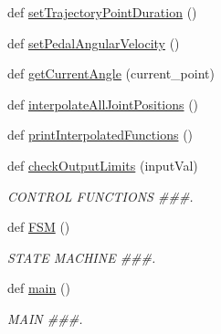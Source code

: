 \begin{DoxyCompactItemize}
\item 
def \mbox{\hyperlink{namespacepedal__simulation__old__trajectory_a21cef15e773ef15a13e249e9313e0f74}{set\+Trajectory\+Point\+Duration}} ()
\item 
def \mbox{\hyperlink{namespacepedal__simulation__old__trajectory_a19dadcf9c99ead53140bc2edb68da664}{set\+Pedal\+Angular\+Velocity}} ()
\item 
def \mbox{\hyperlink{namespacepedal__simulation__old__trajectory_adb00e116383a808c8e63e92e0dcbc8ca}{get\+Current\+Angle}} (current\+\_\+point)
\item 
def \mbox{\hyperlink{namespacepedal__simulation__old__trajectory_aec342beef8b921d695775893efd3692b}{interpolate\+All\+Joint\+Positions}} ()
\item 
def \mbox{\hyperlink{namespacepedal__simulation__old__trajectory_a0d6e7922b0f53ee00a3789bd06837dcf}{print\+Interpolated\+Functions}} ()
\item 
def \mbox{\hyperlink{namespacepedal__simulation__old__trajectory_a4ea25e80b3e7655af96e83c601105731}{check\+Output\+Limits}} (input\+Val)
\begin{DoxyCompactList}\small\item\em C\+O\+N\+T\+R\+OL F\+U\+N\+C\+T\+I\+O\+NS \#\#\#. \end{DoxyCompactList}\item 
def \mbox{\hyperlink{namespacepedal__simulation__old__trajectory_a1ecb34f57b7d71e963eff1185c6fba3e}{F\+SM}} ()
\begin{DoxyCompactList}\small\item\em S\+T\+A\+TE M\+A\+C\+H\+I\+NE \#\#\#. \end{DoxyCompactList}\item 
def \mbox{\hyperlink{namespacepedal__simulation__old__trajectory_af553c74ebb822f6af71cbe2cc03bda6e}{main}} ()
\begin{DoxyCompactList}\small\item\em M\+A\+IN \#\#\#. \end{DoxyCompactList}\end{DoxyCompactItemize}
